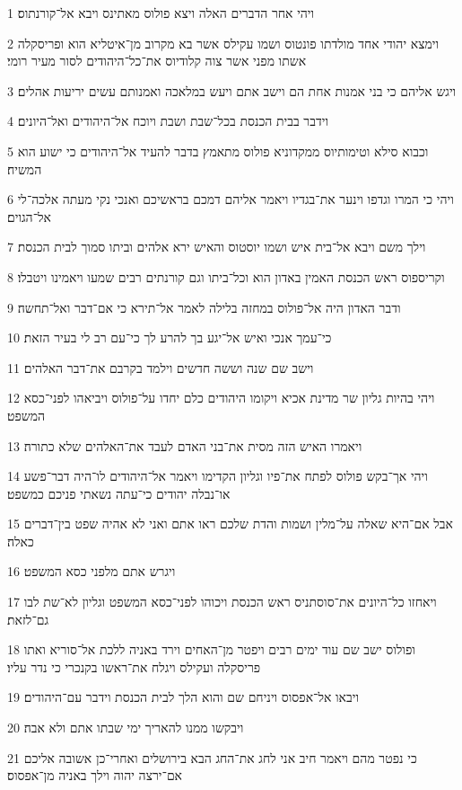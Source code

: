 \par 1 ויהי אחר הדברים האלה ויצא פולוס מאתינס ויבא אל־קורנתוס׃
\par 2 וימצא יהודי אחד מולדתו פונטוס ושמו עקילס אשר בא מקרוב מן־איטליא הוא ופריסקלה אשתו מפני אשר צוה קלודיוס את־כל־היהודים לסור מעיר רומי׃
\par 3 ויגש אליהם כי בני אמנות אחת הם וישב אתם ויעש במלאכה ואמנותם עשים יריעות אהלים׃
\par 4 וידבר בבית הכנסת בכל־שבת ושבת ויוכח אל־היהודים ואל־היונים׃
\par 5 וכבוא סילא וטימותיוס ממקדוניא פולוס מתאמץ בדבר להעיד אל־היהודים כי ישוע הוא המשיח׃
\par 6 ויהי כי המרו וגדפו וינער את־בגדיו ויאמר אליהם דמכם בראשיכם ואנכי נקי מעתה אלכה־לי אל־הגוים׃
\par 7 וילך משם ויבא אל־בית איש ושמו יוסטוס והאיש ירא אלהים וביתו סמוך לבית הכנסת׃
\par 8 וקריספוס ראש הכנסת האמין באדון הוא וכל־ביתו וגם קורנתים רבים שמעו ויאמינו ויטבלו׃
\par 9 ודבר האדון היה אל־פולוס במחזה בלילה לאמר אל־תירא כי אם־דבר ואל־תחשה׃
\par 10 כי־עמך אנכי ואיש אל־יגע בך להרע לך כי־עם רב לי בעיר הזאת׃
\par 11 וישב שם שנה וששה חדשים וילמד בקרבם את־דבר האלהים׃
\par 12 ויהי בהיות גליון שר מדינת אכיא ויקומו היהודים כלם יחדו על־פולוס ויביאהו לפני־כסא המשפט׃
\par 13 ויאמרו האיש הזה מסית את־בני האדם לעבד את־האלהים שלא כתורה׃
\par 14 ויהי אך־בקש פולוס לפתח את־פיו וגליון הקדימו ויאמר אל־היהודים לו־היה דבר־פשע או־נבלה יהודים כי־עתה נשאתי פניכם כמשפט׃
\par 15 אבל אם־היא שאלה על־מלין ושמות והדת שלכם ראו אתם ואני לא אהיה שפט בין־דברים כאלה׃
\par 16 ויגרש אתם מלפני כסא המשפט׃
\par 17 ויאחזו כל־היונים את־סוסתניס ראש הכנסת ויכוהו לפני־כסא המשפט וגליון לא־שת לבו גם־לזאת׃
\par 18 ופולוס ישב שם עוד ימים רבים ויפטר מן־האחים וירד באניה ללכת אל־סוריא ואתו פריסקלה ועקילס ויגלח את־ראשו בקנכרי כי נדר עליו׃
\par 19 ויבאו אל־אפסוס ויניחם שם והוא הלך לבית הכנסת וידבר עם־היהודים׃
\par 20 ויבקשו ממנו להאריך ימי שבתו אתם ולא אבה׃
\par 21 כי נפטר מהם ויאמר חיב אני לחג את־החג הבא בירושלים ואחרי־כן אשובה אליכם אם־ירצה יהוה וילך באניה מן־אפסוס׃
